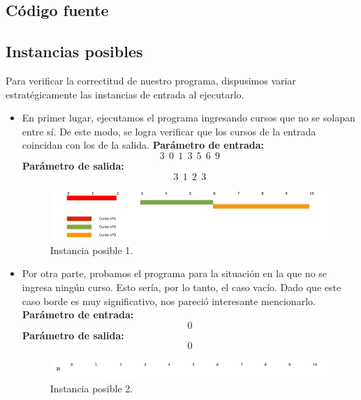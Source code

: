 \subsection{Código fuente}



\subsection{Instancias posibles}

Para verificar la correctitud de nuestro programa, dispusimos variar estratégicamente las instancias de entrada al ejecutarlo.
\begin{itemize}
\item En primer lugar, ejecutamos el programa ingresando cursos que no se solapan entre sí. De este modo, se logra verificar que los cursos de la entrada coincidan con los de la salida.\newline
\textbf{Parámetro de entrada:} $$3\ \ 0\ \ 1\ \ 3\ \ 5\ \ 6\ \ 9$$
\textbf{Parámetro de salida:} $$3\ \ 1\ \ 2\ \ 3$$\newline


\begin{figure}[H] %
\begin{center}
\includegraphics[width=450pt]{../imgs/instancia4.jpg}
\end{center}
\caption{Instancia posible 1.}
\end{figure}

\item Por otra parte, probamos el programa para la situación en la que no se ingresa ningún curso. Esto sería, por lo tanto, el caso vacío. Dado que este caso borde es muy significativo, nos pareció interesante mencionarlo.\newline
\textbf{Parámetro de entrada:} $$0$$
\textbf{Parámetro de salida:} $$0$$ \newline

\begin{figure}[H] %
\begin{center}
\includegraphics[width=450pt]{../imgs/instancia2.jpg}
\end{center}
\caption{Instancia posible 2.}
\end{figure}


\end{itemize}
